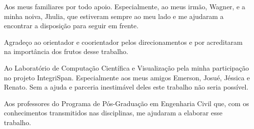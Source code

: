 \begin{agradecimentos}

Aos meus familiares por todo apoio. Especialmente, ao meus irmão, Wagner, e a minha noiva, Jhulia, que estiveram sempre ao meu lado e me ajudaram a encontrar a disposição para seguir em frente.

Agradeço ao orientador e coorientador pelos direcionamentos e por acreditaram na importância dos frutos desse trabalho.

Ao Laboratório de Computação Científica e Visualização pela minha participação no projeto IntegriSpan. Especialmente aos meus amigos Emerson, Josué, Jéssica e Renato. Sem a ajuda e parceria inestimável deles este trabalho não seria possível.

Aos professores do Programa de Pós-Graduação em Engenharia Civil que, com os conhecimentos transmitidos nas disciplinas, me ajudaram a elaborar esse trabalho.

\end{agradecimentos}
